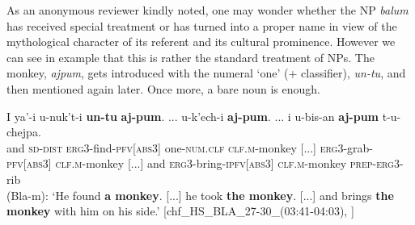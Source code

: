 \documentclass[output=paper
,modfonts
,nonflat]{langsci/langscibook}
\begin{document}
As an anonymous reviewer kindly noted, one may wonder whether the NP \textit{balum} has received special treatment or has turned into a proper name in view of the mythological character of its referent and its cultural prominence. However we can see in example  that this is rather the standard treatment of NPs. The monkey, \textit{ajpum}, gets introduced with the numeral `one' (+ classifier), \textit{un-tu}, and then mentioned again later. Once more, a bare noun is enough.

\ea\label{ex:pico:6} 
\gll  I ya'-i u-nuk't-i \textbf{un-tu} \textbf{aj-pum}. \textnormal{{\ob}...{\cb}} u-k'ech-i \textbf{aj-pum}. \textnormal{{\ob}...{\cb}} i u-bis-an \textbf{aj-pum} t-u-chejpa.\\
and \textsc{sd}-\textsc{dist} \textsc{erg3}-find-\textsc{pfv[abs3]} one-\textsc{num.clf} \textsc{clf.m}-monkey [...] \textsc{erg3}-grab-\textsc{pfv[abs3]} \textsc{clf.m}-monkey [...] and \textsc{erg3}-bring-\textsc{ipfv[abs3]} \textsc{clf.m}-monkey \textsc{prep}-\textsc{erg3}-rib\\
\glt (Bla-m): `He found \textbf{a monkey}. [...] he took \textbf{the monkey}. [...] and brings \textbf{the monkey} with him on his side.' [chf\_HS\_BLA\_27-30\_(03:41-04:03), \citealt{Delgado-Galvan2018archive}]
\z
\end{document}
